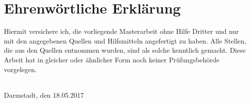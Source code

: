  \chapter*{Ehrenw{\"o}rtliche Erkl{\"a}rung}
 Hiermit versichere ich, die vorliegende Masterarbeit ohne Hilfe Dritter und nur mit den angegebenen Quellen und Hilfsmitteln angefertigt zu haben. Alle Stellen, die aus den Quellen entnommen wurden, sind als solche kenntlich gemacht. Diese Arbeit hat in gleicher oder {\"a}hnlicher Form noch keiner Pr{\"u}fungsbeh{\"o}rde vorgelegen. \\

\vspace{2.5in}

\makebox[2.5in]{\hrulefill} \\%
 \hfill {Darmstadt, den 18.05.2017} \\